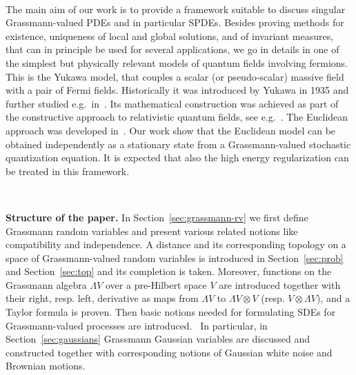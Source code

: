 \documentclass[11pt]{article}
\newcommand{\tmtextbf}[1]{{\bfseries{#1}}}
\begin{document}
\

The main aim of our work is to provide a framework suitable to discuss
singular Grassmann-valued PDEs and in particular SPDEs. Besides proving
methods for existence, uniqueness of local and global solutions, and of
invariant measures, that can in principle be used for several applications, we
go in details in one of the simplest but physically relevant models of quantum
fields involving fermions. This is the Yukawa model, that couples a scalar (or
pseudo-scalar) massive field with a pair of Fermi fields. Historically it was
introduced by Yukawa in 1935 and further studied
e.g.~in~{\cite{matthews_propagators_1955}}. Its mathematical construction was
achieved as part of the constructive approach to relativistic quantum fields,
see
e.g.~{\cite{lanford_iii_construction_1966,mcbryan_volume_1975,glimm_quantum_1985,dimock_estimates_1972}}.
The Euclidean approach was developed
in~{\cite{osterwalder_euclidean_1973-2,seiler_schwinger_1975,seiler_bounds_1975,Gross_Euclidean_1976,williams_euclidean_1974}}.
Our work show that the Euclidean model can be obtained independently as a
stationary state from a Grassmann-valued stochastic quantization equation. It
is expected that also the high energy regularization can be treated in this
framework.

\

{\noindent}\tmtextbf{Structure of the paper.} In
Section~\ref{sec:grassmann-rv} we first define Grassmann random variables and
present various related notions like compatibility and independence. A
distance and its corresponding topology on a space of Grassmann-valued random
variables is introduced in Section~\ref{sec:prob} and Section~\ref{sec:top}
and its completion is taken. Moreover, functions on the Grassmann algebra
$\Lambda V$ over a pre-Hilbert space $V$ are introduced together with their
right, resp. left, derivative as maps from $\Lambda V$ to $\Lambda V \otimes
V$ (resp. $V \otimes \Lambda V$), and a Taylor formula is proven. Then basic
notions needed for formulating SDEs for Grassmann-valued processes are
introduced. \ In particular, in Section~\ref{sec:gaussians} Grassmann Gaussian
variables are discussed and constructed together with corresponding notions of
Gaussian white noise and Brownian motions.
\end{document}
